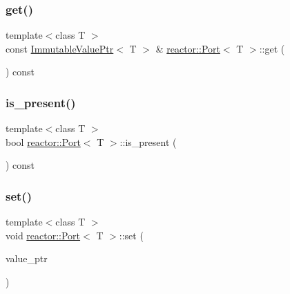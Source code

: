 \subsubsection{\texorpdfstring{get()}{get()}}
{\footnotesize\ttfamily template$<$class T $>$ \\
const \hyperlink{classreactor_1_1ImmutableValuePtr}{Immutable\+Value\+Ptr}$<$ T $>$ \& \hyperlink{classreactor_1_1Port}{reactor\+::\+Port}$<$ T $>$\+::get (\begin{DoxyParamCaption}{ }\end{DoxyParamCaption}) const}

\mbox{\label{classreactor_1_1Port_ab4ab58fa62258a9e79b061ecd3f55946}} 
\subsubsection{\texorpdfstring{is\+\_\+present()}{is\_present()}}
{\footnotesize\ttfamily template$<$class T $>$ \\
bool \hyperlink{classreactor_1_1Port}{reactor\+::\+Port}$<$ T $>$\+::is\+\_\+present (\begin{DoxyParamCaption}{ }\end{DoxyParamCaption}) const}

\mbox{\label{classreactor_1_1Port_ac3d03f90b425a8656911ed3acf462a4d}} 
\subsubsection{\texorpdfstring{set()}{set()}\hspace{0.1cm}{\footnotesize\ttfamily [1/4]}}
{\footnotesize\ttfamily template$<$class T $>$ \\
void \hyperlink{classreactor_1_1Port}{reactor\+::\+Port}$<$ T $>$\+::set (\begin{DoxyParamCaption}\item[{const \hyperlink{classreactor_1_1ImmutableValuePtr}{Immutable\+Value\+Ptr}$<$ T $>$ \&}]{value\+\_\+ptr }\end{DoxyParamCaption})}

\mbox{\label{classreactor_1_1Port_a041b16e47f5b67305ec215513ea92b23}} 
